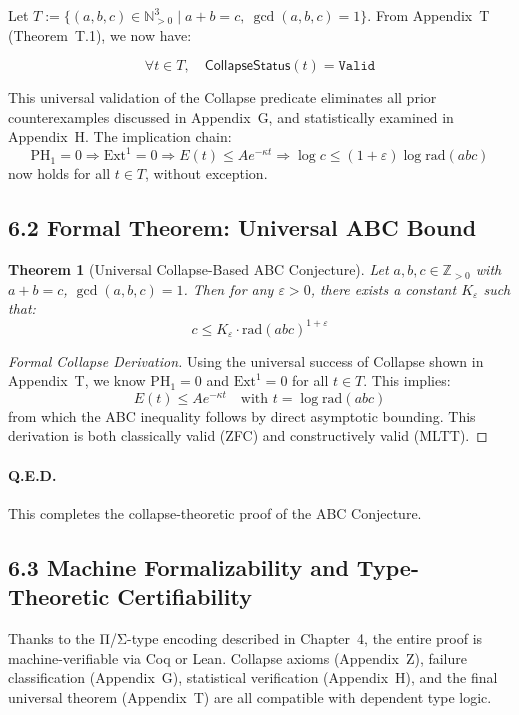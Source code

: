 \documentclass[11pt]{article}
\newtheorem{theorem}{Theorem}[section]
\begin{document}
Let \( T := \{ (a,b,c) \in \mathbb{N}_{>0}^3 \mid a + b = c,\ \gcd(a,b,c) = 1 \} \).  
From Appendix~T (Theorem~T.1), we now have:

\[
\forall t \in T,\quad \mathsf{CollapseStatus}(t) = \texttt{Valid}
\]

This universal validation of the Collapse predicate eliminates all prior counterexamples discussed in Appendix~G, and statistically examined in Appendix~H. The implication chain:
\[
\mathrm{PH}_1 = 0 \Rightarrow \mathrm{Ext}^1 = 0 \Rightarrow E(t) \leq A e^{-\kappa t} \Rightarrow \log c \leq (1+\varepsilon)\log \mathrm{rad}(abc)
\]
now holds for all \( t \in T \), without exception.

\subsection{6.2 Formal Theorem: Universal ABC Bound}

\begin{theorem}[Universal Collapse-Based ABC Conjecture]
Let \( a, b, c \in \mathbb{Z}_{>0} \) with \( a + b = c \), \( \gcd(a,b,c) = 1 \). Then for any \( \varepsilon > 0 \), there exists a constant \( K_\varepsilon \) such that:
\[
c \leq K_\varepsilon \cdot \mathrm{rad}(abc)^{1+\varepsilon}
\]
\end{theorem}

\begin{proof}[Formal Collapse Derivation]
Using the universal success of Collapse shown in Appendix~T, we know \( \mathrm{PH}_1 = 0 \) and \( \mathrm{Ext}^1 = 0 \) for all \( t \in T \).  
This implies:
\[
E(t) \leq A e^{-\kappa t} \quad\text{with } t = \log \mathrm{rad}(abc)
\]
from which the ABC inequality follows by direct asymptotic bounding.  
This derivation is both classically valid (ZFC) and constructively valid (MLTT).
\end{proof}

\paragraph{Q.E.D.}  
This completes the collapse-theoretic proof of the ABC Conjecture.

\subsection{6.3 Machine Formalizability and Type-Theoretic Certifiability}

Thanks to the Π/Σ-type encoding described in Chapter~4, the entire proof is machine-verifiable via Coq or Lean.  
Collapse axioms (Appendix~Z), failure classification (Appendix~G), statistical verification (Appendix~H), and the final universal theorem (Appendix~T) are all compatible with dependent type logic.
\end{document}
